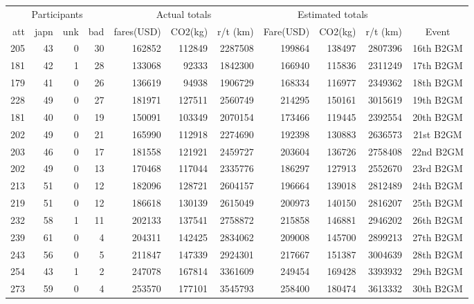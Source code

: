 \begin{table}[htp] 
\setlength{\tabcolsep}{2pt} 
\begin{center} 
\begin{tabular}{|rrrr| rrr| rrr| c|} 
\hline 
\multicolumn{4}{|c|}{Participants} & \multicolumn{3}{c|}{Actual totals} & \multicolumn{3}{c|}{Estimated totals} & \\ 
 att&japn& unk& bad&fares(USD)&   CO2(kg)&  r/t (km)& Fare(USD)&   CO2(kg)&  r/t (km)&Event \\ 
\hline 
 205&  43&   0&  30&    162852&    112849&   2287508&    199864&    138497&   2807396&16th B2GM \\ 
 181&  42&   1&  28&    133068&     92333&   1842300&    166940&    115836&   2311249&17th B2GM \\ 
 179&  41&   0&  26&    136619&     94938&   1906729&    168334&    116977&   2349362&18th B2GM \\ 
 228&  49&   0&  27&    181971&    127511&   2560749&    214295&    150161&   3015619&19th B2GM \\ 
 181&  40&   0&  19&    150091&    103349&   2070154&    173466&    119445&   2392554&20th B2GM \\ 
 202&  49&   0&  21&    165990&    112918&   2274690&    192398&    130883&   2636573&21st B2GM \\ 
 203&  46&   0&  17&    181558&    121921&   2459727&    203604&    136726&   2758408&22nd B2GM \\ 
 202&  49&   0&  13&    170468&    117044&   2335776&    186297&    127913&   2552670&23rd B2GM \\ 
 213&  51&   0&  12&    182096&    128721&   2604157&    196664&    139018&   2812489&24th B2GM \\ 
 219&  51&   0&  12&    186618&    130139&   2615049&    200973&    140150&   2816207&25th B2GM \\ 
 232&  58&   1&  11&    202133&    137541&   2758872&    215858&    146881&   2946202&26th B2GM \\ 
 239&  61&   0&   4&    204311&    142425&   2834062&    209008&    145700&   2899213&27th B2GM \\ 
 243&  56&   0&   5&    211847&    147339&   2924301&    217667&    151387&   3004639&28th B2GM \\ 
 254&  43&   1&   2&    247078&    167814&   3361609&    249454&    169428&   3393932&29th B2GM \\ 
 273&  59&   0&   4&    253570&    177101&   3545793&    258400&    180474&   3613332&30th B2GM \\ 

\end{tabular}
\end{center}
\end{table}
